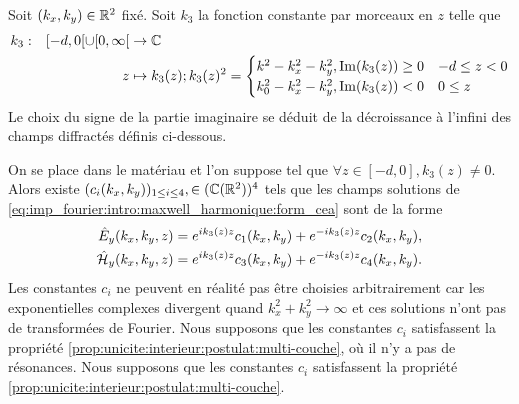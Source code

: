     \begin{defn}
        Soit \((k_x,k_y) \in \mathbb R^2\) fixé.
        Soit \(k_3\) la fonction constante par morceaux en \(z\) telle que
        \begin{equation*}
          \begin{aligned} &k_3: & [-d,0[\cup[0,\infty[ &\rightarrow \mathbb C \\ & & z & \mapsto 
            k_3(z); k_3(z)^2 =
            \begin{cases}
            k^2 - k_x^2 - k_y^2, \operatorname{Im}(k_3(z)) \ge 0 & -d \le z < 0
            \\
            k_0^2 - k_x^2 - k_y^2, \operatorname{Im}(k_3(z)) < 0 & 0 \le z
            \end{cases}
           \end{aligned}
        \end{equation*}
        Le choix du signe de la partie imaginaire se déduit de la décroissance à l'infini des champs diffractés définis ci-dessous.
    \end{defn}

    \begin{prop}
        On se place dans le matériau et l’on suppose tel que \(\forall z \in [-d,0], k_3(z) \not = 0\).
        Alors existe \((c_i(k_x,k_y))_{1\le i \le4}, \in (\mathbb C(\mathbb R^2))^4\) tels que les champs solutions de \ref{eq:imp_fourier:intro:maxwell_harmonique:form_cea} sont de la forme
        \begin{align*}
            \hat{E}_y(k_x,k_y,z) & = e^{ik_3(z)z}c_1(k_x,k_y) + e^{-ik_3(z)z}c_2(k_x,k_y),
            \\
            \hat{\mathcal{H}}_y(k_x,k_y,z) & = e^{ik_3(z)z}c_3(k_x,k_y) + e^{-ik_3(z)z}c_4(k_x,k_y).
        \end{align*}
        Les constantes \(c_i\) ne peuvent en réalité pas être choisies arbitrairement car les exponentielles complexes divergent quand \(k_x^2 + k_y^2 \rightarrow \infty\) et ces solutions n'ont pas de transformées de Fourier. Nous supposons que les constantes \(c_i\) satisfassent la propriété \eqref{prop:unicite:interieur:postulat:multi-couche}, où il n'y a pas de résonances.
        Nous supposons que les constantes \(c_i\) satisfassent la propriété \eqref{prop:unicite:interieur:postulat:multi-couche}.

    \end{prop}

